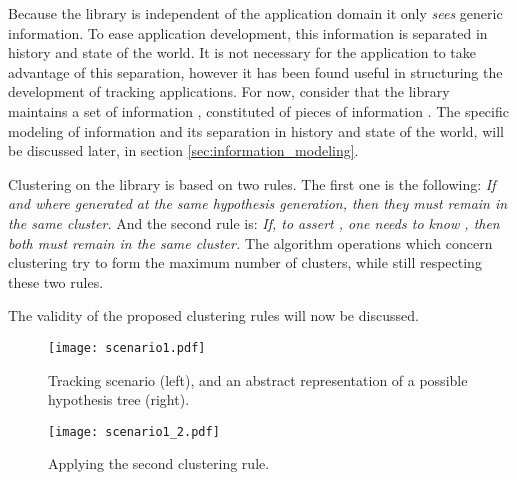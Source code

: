 Because the library is independent of the application domain it only \textit{sees} generic information. To ease application development, this information is separated in history and state of the world. It is not necessary for the application to take advantage of this separation, however it has been found useful in structuring the development of tracking applications. For now, consider that the library maintains a set of information , constituted of pieces of information . The specific modeling of information and its separation in history and state of the world, will be discussed later, in section \ref{sec:information_modeling}.

Clustering on the library is based on two rules. The first one is the following:
\textit{If  and  where generated at the same hypothesis generation, then they must remain in the same cluster.}
And the second rule is:
\textit{If, to assert , one needs to know , then both must remain in the same cluster.}
The algorithm operations which concern clustering try to form the maximum number of clusters, while still respecting these two rules.

The validity of the proposed clustering rules will now be discussed.

\ifx \ommitimages  \undefined
\begin{figure}
\begin{minipage}[b]{0.6\textwidth}
    \centering
    \texttt{[image: scenario1.pdf]}
    \caption{Tracking scenario (left), and an abstract representation of a possible hypothesis tree (right).}
    \label{fig:single_track}
\end{minipage}
\hspace{0\textwidth}
\begin{minipage}[b]{0.4\textwidth}
	\centering
	\texttt{[image: scenario1\_2.pdf]}
	\caption{Applying the second clustering rule.}
	\label{fig:second_rule2}
\end{minipage}
\end{figure}
\fi


